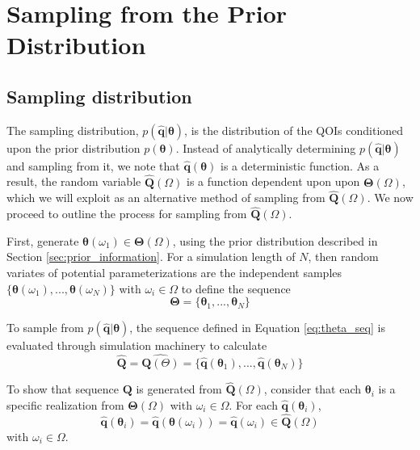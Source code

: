 \section{Sampling from the Prior Distribution}
\label{sec:sampling}

\subsection{Sampling distribution}

The sampling distribution, $p(\hat{\bm{q}}|\bm{\theta})$, is the distribution of the QOIs conditioned upon the prior distribution $p(\bm{\theta})$.  Instead of analytically determining $p(\hat{\bm{q}}|\bm{\theta})$ and sampling from it, we note that $\hat{\bm{q}}(\bm{\theta})$ is a deterministic function.  As a result, the random variable $\hat{\bm{Q}}(\Omega)$ is a function dependent upon upon $\bm{\Theta}(\Omega)$, which we will exploit as an alternative method of sampling from $\hat{\bm{Q}}(\Omega)$.  We now proceed to outline the process for sampling from $\hat{\bm{Q}}(\Omega)$.

First, generate $\bm{\theta}(\omega_1) \in \bm{\Theta}(\Omega)$, using the prior distribution described in Section \ref{sec:prior_information}.  For a simulation length of $N$, then random variates of potential parameterizations are the independent samples $\{\bm{\theta}(\omega_1),...,\bm{\theta}(\omega_N)\}$ with $\omega_i \in \Omega$ to define the sequence
\begin{equation}
\label{eq:theta_seq}
	  \bm{\Theta} = \{\bm{\theta}_1,...,\bm{\theta}_N\}
\end{equation}

To sample from $p(\hat{\bm{q}}|\bm{\theta})$, the sequence defined in Equation \ref{eq:theta_seq} is evaluated through simulation machinery to calculate
\begin{equation}
\label{eq:qoi_seq}
	\hat{\bm{Q}}
	= \hat{\bm{Q}(\Theta)}
	= \{\hat{\bm{q}}(\bm{\theta}_1),...,\hat{\bm{q}}(\bm{\theta}_N)\}
\end{equation}

To show that sequence $\bm{Q}$ is generated from $\hat{\bm{Q}}(\Omega)$, consider that each $\bm{\theta}_i$ is a specific realization from $\bm{\Theta}(\Omega)$ with $\omega_i \in \Omega$.
For each $\hat{\bm{q}}(\bm{\theta}_i)$,
\begin{equation}
	\hat{\bm{q}}(\bm{\theta}_i) = \hat{\bm{q}}(\bm{\theta}(\omega_i)) = \hat{\bm{q}}(\omega_i) \in \hat{\bm{Q}}(\Omega)
\end{equation}
with $\omega_i \in \Omega$.

